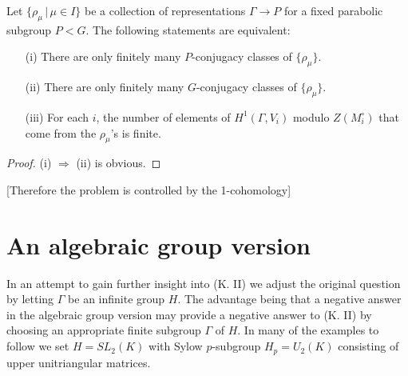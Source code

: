 \begin{lemma} Let $\{\rho_\mu\, |\, \mu \in I\}$ be a collection of representations $\Gamma\rightarrow P$ for a fixed parabolic subgroup $P<G$. The following statements are equivalent:
	\begin{itemize}
		\item[(i)] There are only finitely many $P$-conjugacy classes of $\{\rho_\mu\}$.
		\item[(ii)] There are only finitely many $G$-conjugacy classes of $\{\rho_\mu\}$.
		\item[(iii)] For each $i$, the number of elements of $H^1(\Gamma, V_i)$ modulo $Z(M_i^\circ)$ that come from the $\rho_\mu$'s is finite.
	\end{itemize}
\end{lemma}
\begin{proof}
	(i) $\Rightarrow$ (ii) is obvious. 
\end{proof}

% 
% 
% 
% 

[Therefore the problem is controlled by the 1-cohomology]

\section{An algebraic group version}

In an attempt to gain further insight into (K. II) we adjust the original question by letting $\Gamma$ be an infinite group $H$. The advantage being that a negative answer in the algebraic group version may provide a negative answer to (K. II) by choosing an appropriate finite subgroup $\Gamma$ of $H$. In many of the examples to follow we set $H = SL_2(K)$ with Sylow $p$-subgroup $H_p = U_2(K)$ consisting of upper unitriangular matrices. 

